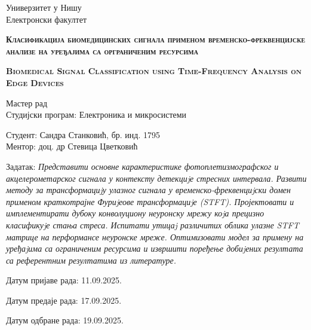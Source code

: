\begin{flushleft}
    Универзитет у Нишу \\

    Електронски факултет \\
    
    \vspace{5mm}
    
\end{flushleft}

    \noindent \textsc{\textbf{Класификација биомедицинских сигнала применом временско-фреквенцијске анализе на уређајима са орграниченим ресурсима}}
    
    \noindent \textsc{\textbf{Biomedical Signal Classification using Time-Frequency Analysis on Edge Devices}}\\
    
    
\begin{flushleft}

    Мастер рад\\
    
    Студијски програм: Електроника и микросистеми\\
    
    \vspace{5mm}
    
    Студент: Сандра Станковић, бр. инд. 1795\\
    
    Ментор: доц. др Стевица Цветковић
    \vspace{5mm}\\
    \end{flushleft}
    
    \noindent Задатак: \textit{Представити основне карактеристике фотоплетизмографског и акцелерометарског сигнала у контексту детекциjе стресних интервала. Развити методу за трансформациjу улазног сигнала у временско-фреквенциjски домен применом краткотрајне Фуриjеове трансформациjе (STFT). Пројектовати и имплементирати дубоку конволуциону неуронску мрежу коjа прецизно класификуjе стања стреса. Испитати утицаj различитих облика улазне STFT матрице на перформансе неуронске мреже. Оптимизовати модел за примену на уређаjима са ограниченим ресурсима и извршити поређење добиjених резултата са референтним резултатима из литературе.}

    
    \begin{flushleft}
    
    Датум пријаве рада: 11.09.2025.
    
    Датум предаје рада: 17.09.2025.
    
    Датум одбране рада: 19.09.2025. \\
    
    \vspace{5mm}
\end{flushleft}


